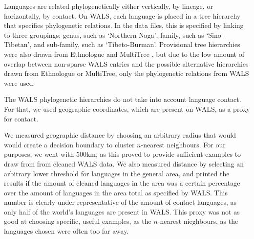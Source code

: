 \documentclass[11pt]{article}
\begin{document}
Languages are related phylogenetically either vertically, by lineage, or horizontally, by contact. On WALS, each language is placed in a tree hierarchy that specifies phylogenetic relations. In the data files, this is specified by linking to three groupings: genus, such as `Northern Naga', family, such as `Sino-Tibetan', and sub-family, such as `Tibeto-Burman'. Provisional tree hierarchies were also drawn from Ethnologue \cite{ethnologue} and MultiTree \cite{multitree}, but due to the low amount of overlap between non-sparse WALS entries and the possible alternative hierarchies drawn from Ethnologue or MultiTree, only the phylogenetic relations from WALS were used.




The WALS phylogenetic hierarchies do not take into account language contact. For that, we used geographic coordinates, which are present on WALS, as a proxy for contact. 

We measured geographic distance by choosing an arbitrary radius that would would create a decision boundary to cluster $n$-nearest neighbours. For our purposes, we went with 500km, as this proved to provide sufficient examples to draw from from cleaned WALS data. We also measured distance by selecting an arbitrary lower threshold for languages in the general area, and printed the results if the amount of cleaned languages in the area was a certain percentage over the amount of languages in the area total as specified by WALS. This number is clearly under-representative of the amount of contact languages, as only half of the world's languages are present in WALS. This proxy was not as good at choosing specific, useful examples, as the $n$-nearest nieghbours, as the languages chosen were often too far away. 
\end{document}
